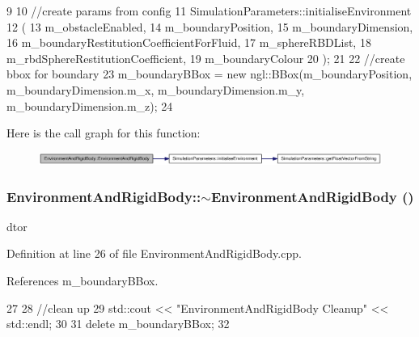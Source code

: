 \begin{DoxyCode}
9 {
10     //create params from config
11     SimulationParameters::initialiseEnvironment
12                             (
13                                 m_obstacleEnabled,
14                                 m_boundaryPosition,
15                                 m_boundaryDimension,
16                                 m_boundaryRestitutionCoefficientForFluid,
17                                 m_sphereRBDList,
18                                 m_rbdSphereRestitutionCoefficient,
19                                 m_boundaryColour
20                             );
21 
22     //create bbox for boundary
23     m_boundaryBBox = new ngl::BBox(m_boundaryPosition, m_boundaryDimension.m_x, 
      m_boundaryDimension.m_y, m_boundaryDimension.m_z);
24 }
\end{DoxyCode}




Here is the call graph for this function:\nopagebreak
\begin{figure}[H]
\begin{center}
\leavevmode
\includegraphics[width=403pt]{class_environment_and_rigid_body_adbea7b16726fc80bdaa7cfe528cfe380_cgraph}
\end{center}
\end{figure}


\hypertarget{class_environment_and_rigid_body_afab15b296ce8014225d98c0504d443ce}{
\subsubsection[{$\sim$EnvironmentAndRigidBody}]{\setlength{\rightskip}{0pt plus 5cm}EnvironmentAndRigidBody::$\sim$EnvironmentAndRigidBody ()}}
\label{class_environment_and_rigid_body_afab15b296ce8014225d98c0504d443ce}


dtor 



Definition at line 26 of file EnvironmentAndRigidBody.cpp.



References m\_\-boundaryBBox.




\begin{DoxyCode}
27 {
28     //clean up
29     std::cout << "EnvironmentAndRigidBody Cleanup" << std::endl;
30 
31     delete m_boundaryBBox;
32 }
\end{DoxyCode}




